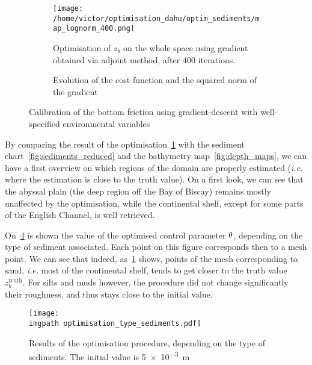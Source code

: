 \documentclass[../../Main_ManuscritThese.tex]{subfiles}
\newcommand{\zob}{z_b}
\newcommand\imgpath{/home/victor/acadwriting/Manuscrit/Text/Chapter5/img/}
\begin{document}
\begin{figure}[ht]
  \begin{subfigure}{\textwidth}
  \centering
  \texttt{[image: /home/victor/optimisation\_dahu/optim\_sediments/map\_lognorm\_400.png]}
  \caption[Optimisation of $\zob$ on the whole
  space]{\label{fig:optimization_map_399} Optimisation of $\zob$ on
    the whole space using gradient obtained via adjoint method, after
    $400$ iterations.}
\end{subfigure}
\begin{subfigure}{\textwidth}
  \centering
  
  \caption{\label{fig:ctrl_true} Evolution of the cost function and
    the squared norm of the gradient}
\end{subfigure}
\caption{Calibration of the bottom friction using gradient-descent
  with well-specified environmental variables}
\end{figure}
By comparing the result of the
optimisation~\cref{fig:optimization_map_399} with the sediment
chart~\cref{fig:sediments_reduced} and the bathymetry
map~\cref{fig:depth_maps}, we can have a first overview on which
regions of the domain are properly estimated (\emph{i.e.} where the
estimation is close to the truth value).  On a first look, we can see
that the abyssal plain (the deep region off the Bay of Biscay) remains
mostly unaffected by the optimisation, while the continental shelf,
except for some parts of the English Channel, is well retrieved.


On~\cref{fig:optimisation_type_sediments} is shown the value of the
optimised control parameter $\theta$, depending on the type of sediment
associated. Each point on this figure corresponds then to a mesh
point.
We can see that indeed, as~\cref{fig:optimization_map_399} shows,
points of the mesh corresponding to sand, \emph{i.e.} most of the
continental shelf, tends to get closer to the truth value
$\zob^{\mathrm{truth}}$. For silts and muds however, the procedure
did not change significantly their roughness, and thus stays close to
the initial value.

\begin{figure}[ht]
  \centering
  \texttt{[image: \\imgpath optimisation\_type\_sediments.pdf]}
  \caption[Final values of the optimisation procedure, based on the
  sediment type]{\label{fig:optimisation_type_sediments} Results of
    the optimisation procedure, depending on the type of
    sediments. The initial value is \SI{5e-3}{\meter}}
\end{figure}
\end{document}

